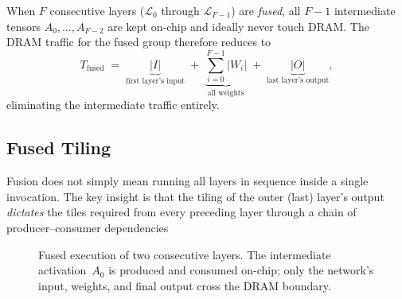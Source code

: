 When $F$ consecutive layers ($\mathcal{L}_0$ through
$\mathcal{L}_{F-1}$) are \emph{fused}, all $F-1$ intermediate tensors
$A_0, \dots, A_{F-2}$ are kept on-chip and ideally never touch DRAM.
The DRAM traffic for the fused group therefore reduces to
\begin{equation}
\label{eq:fused-traffic}
T_{\text{fused}}
  \;=\; \underbrace{|I|}_{\text{first layer's input}}
  \;+\; \underbrace{\sum_{i=0}^{F-1}|W_i|}_{\text{all weights}}
  \;+\; \underbrace{|O|}_{\text{last layer's output}},
\end{equation}
eliminating the intermediate traffic entirely.

\subsection{Fused Tiling}
\label{sec:fused-tiling}

Fusion does not simply mean running all layers in sequence inside a
single invocation.
The key insight is that the tiling of the outer (last) layer's output
\emph{dictates} the tiles required from every preceding layer through
a chain of producer--consumer dependencies

\begin{figure}[t]
\centering
{}
\caption{Fused execution of two consecutive layers.  The intermediate
  activation~$A_0$ is produced and consumed on-chip; only the network's
  input, weights, and final output cross the DRAM boundary.}
\label{fig:fused-two-layers}
\end{figure}

